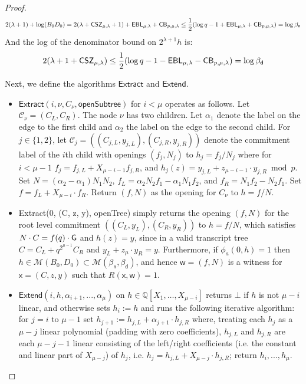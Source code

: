 \begin{proof}
$$2(\lambda + 1) + \log (B_0 D_0) = 2(\lambda + \CSZ[\mu] + 1) + \EBL[\mu] + \CorrectnessBound \leq \frac{1}{2}(\log q - 1 + \EBL[\mu] + \CorrectnessBound) = \log \beta_\textsf{n}$$ 
And the log of the denominator bound on $2^{\lambda + 1} h$ is: 
$$2(\lambda + 1 +  \CSZ[\mu]) \leq \frac{1}{2}(\log q - 1 - \EBL[\mu] - \CorrectnessBound) = \log \beta_\textsf{d}$$

Next, we define the algorithms $\textsf{Extract}$ and $\textsf{Extend}$. 

\begin{itemize} 
\item $\textsf{Extract}(i, \nu, C_\nu, \textsf{openSubtree})$ for $i < \mu$ operates as follows. Let $\mathcal{C}_\nu = (C_L, C_R)$. The node $\nu$ has two children. Let $\alpha_1$ denote the label on the edge to the first child and $\alpha_2$ the label on the edge to the second child. For $j \in \{1,2\}$, let $\mathcal{C}_j = ((C_{j,L}, y_{j, L}), (C_{j,R}, y_{j,R}))$ denote the commitment label of the $i$th child with openings $(f_j, N_j)$ to $h_j = f_j/N_j$ where for $i<\mu-1$ $f_j = f_{j, L} + X_{\mu - i - 1} f_{j, R}$, and $h_j(z) = y_{j,L} + z_{{\mu - i -1}}\cdot  y_{j,R} \bmod p$. Set $N = (\alpha_2 - \alpha_1) N_1 N_2$, $f_L = \alpha_2 N_2 f_1 - \alpha_1 N_1 f_2$, and $f_R = N_1 f_2 - N_2 f_1$. Set $f = f_L + X_{{\mu - i }}\cdot f_R$. Return $(f, N)$ as the opening for $C_\nu$ to $h = f/N$. 


\item \textsf{Extract}(0, (C, z, y), \textsf{openTree}) simply returns the opening $(f, N)$ for the root level commitment $((C_L, y_L), (C_R, y_R))$ to $h = f/N$, which satisfies $N \cdot C = f(q) \cdot \gr{G}$ and $h(z) = y$, since in a valid transcript tree $C = C_L + q^{2^{\mu -1}} C_R$ and $y_L + z_{\mu} \cdot y_R = y$.  Furthermore, if $\phi_a(0, h) = 1$ then $h \in \mathcal{M}(B_0, D_0) \subset \mathcal{M}(\beta_\textsf{n}, \beta_\textsf{d})$, and hence $\mathsf{w} = (f, N)$ is a witness for $\mathsf{x} = (C, z, y)$ such that $R(\mathsf{x}, \mathsf{w}) = 1$. 



\item $\textsf{Extend}(i, h, \alpha_{i+1},...,\alpha_\mu)$ on $h \in \mathbb{Q}[X_1,\dots,X_{\mu-i}]$ returns $\bot$ if $h$ is not $\mu-i$ linear, and otherwise sets $h_i := h$ and runs the following iterative algorithm: for $j = i$ to $\mu-1$ set $h_{j+1} := h_{j, L} + \alpha_{j+1} \cdot h_{j,R}$ where, treating each $h_j$ as a ${\mu - j}$ linear polynomial (padding with zero coefficients), $h_{j,L}$ and $h_{j, R}$ are each ${\mu -j - 1}$ linear consisting of the left/right coefficients (i.e. the constant and linear part of $X_{\mu-j}$) of $h_j$, i.e. $h_j = h_{j,L} + X_{{\mu - j}}\cdot  h_{j,R}$; return $h_i,...,h_\mu$. 


\end{itemize}
\end{proof}

